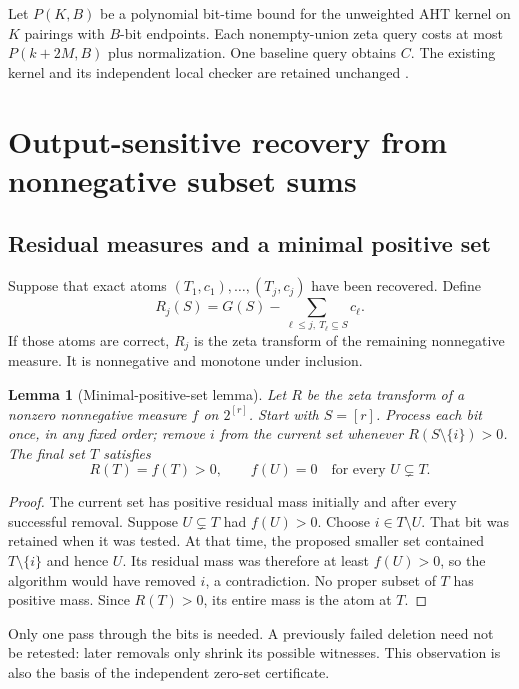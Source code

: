 \documentclass[11pt,letterpaper]{article}
\newtheorem{lemma}[theorem]{Lemma}
\theoremstyle{definition}
\newcommand{\full}{[r]}
\begin{document}
Let $P(K,B)$ be a polynomial bit-time bound for the unweighted AHT kernel on
$K$ pairings with $B$-bit endpoints. Each nonempty-union zeta query costs at
most $P(k+2M,B)$ plus normalization. One baseline query obtains $C$. The
existing kernel and its independent local checker are retained unchanged
\cite{repo-orbits,repo-certificates}.

\section{Output-sensitive recovery from nonnegative subset sums}\label{sec:recovery}

\subsection{Residual measures and a minimal positive set}
Suppose that exact atoms $(T_1,c_1),\ldots,(T_j,c_j)$ have been recovered.
Define
\begin{equation}\label{eq:residual}
 R_j(S)=G(S)-\sum_{\ell\le j,\ T_\ell\subseteq S}c_\ell.
\end{equation}
If those atoms are correct, $R_j$ is the zeta transform of the remaining
nonnegative measure. It is nonnegative and monotone under inclusion.

\begin{lemma}[Minimal-positive-set lemma]\label{lem:minimal}
Let $R$ be the zeta transform of a nonzero nonnegative measure $f$ on
$2^{\full}$. Start with $S=\full$. Process each bit once, in any fixed order;
remove $i$ from the current set whenever $R(S\setminus\{i\})>0$.
The final set $T$ satisfies
\[
 R(T)=f(T)>0,\qquad f(U)=0\quad\text{for every }U\subsetneq T.
\]
\end{lemma}
\begin{proof}
The current set has positive residual mass initially and after every
successful removal. Suppose $U\subsetneq T$ had $f(U)>0$. Choose
$i\in T\setminus U$. That bit was retained when it was tested. At that
time, the proposed smaller set contained $T\setminus\{i\}$ and hence $U$.
Its residual mass was therefore at least $f(U)>0$, so the algorithm would
have removed $i$, a contradiction. No proper subset of $T$ has positive
mass. Since $R(T)>0$, its entire mass is the atom at $T$.
\end{proof}
Only one pass through the bits is needed. A previously failed deletion need
not be retested: later removals only shrink its possible witnesses. This
observation is also the basis of the independent zero-set certificate.
\end{document}
